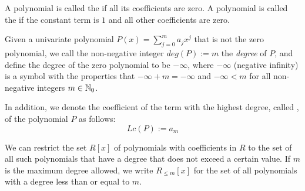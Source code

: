 A polynomial is called the  if all its coefficients are zero. A polynomial is called the  if the constant term is $1$ and all other coefficients are zero.

Given a univariate polynomial $P(x)=\sum_{j=0}^m a_jx^j$ that is not the zero polynomial, we call the non-negative integer $deg(P):=m$  the \textit{degree} of $P$, and define the degree of the zero polynomial to be $-\infty$, where $-\infty$ (negative infinity) is a symbol with the properties that $-\infty + m = -\infty$ and $-\infty < m$ for all non-negative integers $m\in\mathbb{N}_0$. 

In addition, we denote the coefficient of the term with the highest degree, called , of the polynomial $P$ as follows:
\begin{equation}
\label{def_leading_coefficient}
Lc(P):=a_m
\end{equation}

We can restrict the set $R[x]$ of  polynomials with coefficients in $R$ to the set of all such polynomials that have a degree that does not exceed a certain value. If $m$ is the maximum degree allowed, we write $R_{\leq m}[x]$ for the set of all polynomials with a degree less than or equal to $m$.

